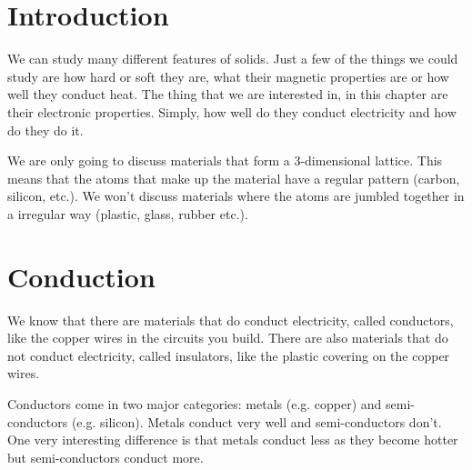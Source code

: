 \section{Introduction}

We can study many different features of solids. Just a few of the things we could study are how hard or soft they are, what their magnetic properties are or how well they conduct heat. The thing that we are interested in, in this chapter are their electronic properties. Simply, how well do they conduct electricity and how do they do it.

We are only going to discuss materials that form a 3-dimensional lattice. This means that the atoms that make up the material have a regular pattern (carbon, silicon, etc.). We won't discuss materials where the atoms are jumbled together in a irregular way (plastic, glass, rubber etc.).

\section{Conduction}

We know that there are materials that do conduct electricity, called conductors, like the copper wires in the circuits you build. There are also materials that do not conduct electricity, called insulators, like the plastic covering on the copper wires.

Conductors come in two major categories: metals (e.g. copper) and semi-conductors (e.g. silicon). Metals conduct very well and semi-conductors don't. One very interesting difference is that metals conduct less as they become hotter but semi-conductors conduct more.

